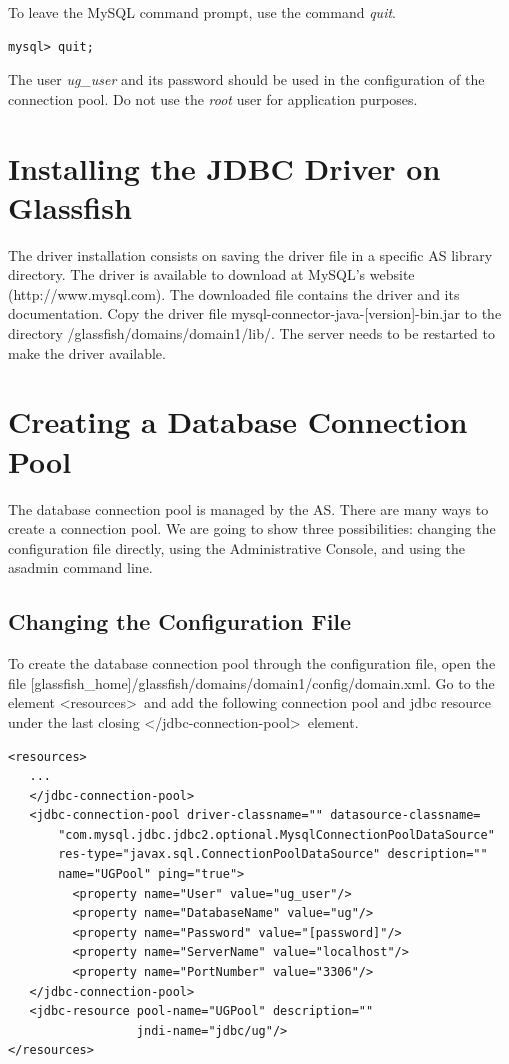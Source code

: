 \documentclass[envcountsame,envcountchap]{svmono}
\begin{document}
To leave the MySQL command prompt, use the command \textit{quit}.

\begin{verbatim}
mysql> quit;
\end{verbatim}

The user \textit{ug\_user} and its password should be used in the configuration of the connection pool. Do not use the \textit{root} user for application purposes.

\section{Installing the JDBC Driver on Glassfish}

The driver installation consists on saving the driver file in a specific AS library directory. The driver is available to download at MySQL's website (http://www.mysql.com). The downloaded file contains the driver and its documentation. Copy  the driver file mysql-connector-java-[version]-bin.jar to the directory /glassfish/domains/domain1/lib/. The server needs to be restarted to make the driver available.

\section{Creating a Database Connection Pool}
\label{sec:creating-database-connection-pool}

The database connection pool is managed by the AS. There are many ways to create a connection pool. We are going to show three possibilities: changing the configuration file directly, using the Administrative Console, and using the asadmin command line.

\subsection{Changing the Configuration File}

To create the database connection pool through the configuration file, open the file [glassfish\_home]/glassfish/domains/domain1/config/domain.xml. Go to the element \textless resources\textgreater \ and add the following connection pool and jdbc resource under the last closing \textless /jdbc-connection-pool\textgreater \ element.

\begin{verbatim}
<resources>
   ...
   </jdbc-connection-pool>
   <jdbc-connection-pool driver-classname="" datasource-classname=
       "com.mysql.jdbc.jdbc2.optional.MysqlConnectionPoolDataSource"
       res-type="javax.sql.ConnectionPoolDataSource" description="" 
       name="UGPool" ping="true">
         <property name="User" value="ug_user"/>
         <property name="DatabaseName" value="ug"/>
         <property name="Password" value="[password]"/>
         <property name="ServerName" value="localhost"/>
         <property name="PortNumber" value="3306"/>
   </jdbc-connection-pool>
   <jdbc-resource pool-name="UGPool" description="" 
                  jndi-name="jdbc/ug"/>
</resources>
\end{verbatim}
\end{document}
